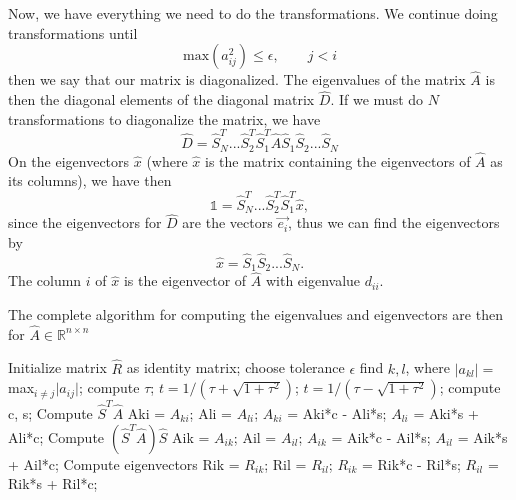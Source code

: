 \documentclass[%
 reprint,
nofootinbib,
aps,
]{revtex4-1}
\begin{document}
Now, we have everything we need to do the transformations. We continue doing transformations until
\begin{equation}
  \text{max}(a_{ij}^2) \leq \epsilon \label{off_A}, \qquad j<i
\end{equation}
then we say that our matrix is diagonalized. The eigenvalues of the matrix $\hat{A}$ is then the diagonal elements of the diagonal matrix $\hat{D}$. If we must do $N$ transformations to diagonalize the matrix, we have
\begin{equation}
\hat{D} = \hat{S}^T_N ... \hat{S}^T_2 \hat{S}^T_1\hat{A} \hat{S}_1\hat{S}_2...\hat{S}_N
\end{equation}
On the eigenvectors $\hat{x}$ (where $\hat{x}$ is the matrix containing the eigenvectors of $\hat{A}$ as its columns), we have then
\begin{equation}
\mathds{1} = \hat{S}^T_N...\hat{S}^T_2\hat{S}^T_1\hat{x},
\end{equation}
since the eigenvectors for $\hat{D}$ are the vectors $\vec{e_i}$, thus we can find the eigenvectors by
\begin{equation}
\hat{x} = \hat{S}_1\hat{S}_2...\hat{S}_N.
\end{equation}
The column $i$ of $\hat{x}$ is the eigenvector of $\hat{A}$ with eigenvalue $d_{ii}$.

The complete algorithm for computing the eigenvalues and eigenvectors are then for $\hat{A} \in \mathds{R}^{n\times n}$
\begin{algorithmic}[H]
\State
\State Initialize matrix $\hat{R}$ as identity matrix;
\State choose tolerance $\epsilon$
	\State find $k,l$, where $\lvert a_{kl}\rvert = $max$_{i\neq j}\lvert a_{ij}\rvert$;
	\State compute $\tau$;
		\State $t = 1/(\tau + \sqrt{1 + \tau^2})$;
	\EndIf
		\State $t = 1/(\tau - \sqrt{1 + \tau^2})$;
	\EndIf
	\State compute c, s;
	 \Comment Compute $\hat{S}^T\hat{A}$
		\State Aki = $A_{ki}$;
   		\State  Ali = $A_{li}$;
   		\State $A_{ki}$ = Aki*c - Ali*s;
   		\State $A_{li}$ = Aki*s + Ali*c;
	\EndFor
	 \Comment Compute $(\hat{S}^T\hat{A})\hat{S}$
		\State Aik = $A_{ik}$;
   		\State Ail = $A_{il}$;
   		\State $A_{ik}$ = Aik*c - Ail*s;
   		\State $A_{il}$ = Aik*s + Ail*c;
	\EndFor
	 \Comment Compute eigenvectors
		\State Rik = $R_{ik}$;
    		\State Ril = $R_{il}$;
     	\State $R_{ik}$ = Rik*c - Ril*s;
    		\State $R_{il}$ = Rik*s + Ril*c;
	\EndFor
\EndWhile
\State
\end{algorithmic}
\end{document}
